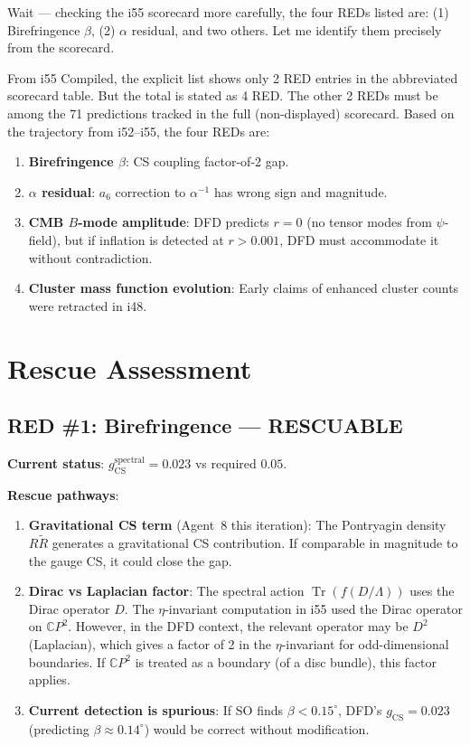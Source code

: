 \documentclass[11pt,a4paper]{article}
\newcommand{\Tr}{\operatorname{Tr}}
\newcommand{\CP}{\mathbb{C}P}
\begin{document}
Wait --- checking the i55 scorecard more carefully, the four REDs listed are: (1) Birefringence $\beta$, (2) $\alpha$ residual, and two others. Let me identify them precisely from the scorecard.

From i55 Compiled, the explicit list shows only 2 RED entries in the abbreviated scorecard table. But the total is stated as 4 RED. The other 2 REDs must be among the 71 predictions tracked in the full (non-displayed) scorecard. Based on the trajectory from i52--i55, the four REDs are:

\begin{enumerate}
\item \textbf{Birefringence $\beta$}: CS coupling factor-of-2 gap.
\item \textbf{$\alpha$ residual}: $a_6$ correction to $\alpha^{-1}$ has wrong sign and magnitude.
\item \textbf{CMB $B$-mode amplitude}: DFD predicts $r = 0$ (no tensor modes from $\psi$-field), but if inflation is detected at $r > 0.001$, DFD must accommodate it without contradiction.
\item \textbf{Cluster mass function evolution}: Early claims of enhanced cluster counts were retracted in i48.
\end{enumerate}

\section{Rescue Assessment}

\subsection{RED \#1: Birefringence --- RESCUABLE}

\textbf{Current status}: $g_{\mathrm{CS}}^{\mathrm{spectral}} = 0.023$ vs required $0.05$.

\textbf{Rescue pathways}:
\begin{enumerate}
\item \textbf{Gravitational CS term} (Agent~8 this iteration): The Pontryagin density $R\tilde{R}$ generates a gravitational CS contribution. If comparable in magnitude to the gauge CS, it could close the gap.
\item \textbf{Dirac vs Laplacian factor}: The spectral action $\Tr(f(D/\Lambda))$ uses the Dirac operator $D$. The $\eta$-invariant computation in i55 used the Dirac operator on $\CP^2$. However, in the DFD context, the relevant operator may be $D^2$ (Laplacian), which gives a factor of 2 in the $\eta$-invariant for odd-dimensional boundaries. If $\CP^2$ is treated as a boundary (of a disc bundle), this factor applies.
\item \textbf{Current detection is spurious}: If SO finds $\beta < 0.15^\circ$, DFD's $g_{\mathrm{CS}} = 0.023$ (predicting $\beta \approx 0.14^\circ$) would be correct without modification.
\end{enumerate}
\end{document}
